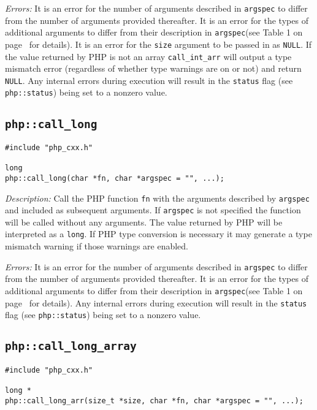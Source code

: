 \documentclass[11pt,titlepage]{article}
\begin{document}
\emph{Errors:} It is an error for the number of arguments described in \verb|argspec| to differ from the number of arguments provided thereafter. It is an error for the types of additional arguments to differ from their description in \verb|argspec|(see Table 1 on page~\pageref{Table1} for details). It is an error for the \verb|size| argument to be passed in as \verb|NULL|. If the value returned by PHP is not an array \verb|call_int_arr| will output a type mismatch error (regardless of whether type warnings are on or not) and return \verb|NULL|. Any internal errors during execution will result in the \verb|status| flag (see \verb|php::status|) being set to a nonzero value.


\subsection{\texttt{php::call\_long}}

\begin{verbatim}
#include "php_cxx.h"

long 
php::call_long(char *fn, char *argspec = "", ...);
\end{verbatim}

\emph{Description:} Call the PHP function \verb|fn| with the arguments described by \verb|argspec| and included as subsequent arguments. If \verb|argspec| is not specified the function will be called without any arguments. The value returned by PHP will be interpreted as a \verb|long|. If PHP type conversion is necessary it may generate a type mismatch warning if those warnings are enabled.

\emph{Errors:} It is an error for the number of arguments described in \verb|argspec| to differ from the number of arguments provided thereafter. It is an error for the types of additional arguments to differ from their description in \verb|argspec|(see Table 1 on page~\pageref{Table1} for details). Any internal errors during execution will result in the \verb|status| flag (see \verb|php::status|) being set to a nonzero value.


\subsection{\texttt{php::call\_long\_array}}

\begin{verbatim}
#include "php_cxx.h"

long *
php::call_long_arr(size_t *size, char *fn, char *argspec = "", ...);
\end{verbatim}
\end{document}
